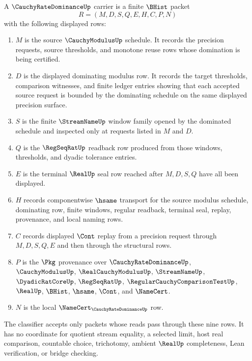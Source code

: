 \begin{definition}
\label{def:cauchy-rate-dominance-carrier}
A $\CauchyRateDominanceUp$ carrier is a finite $\BHist$ packet
$$
R=(M,D,S,Q,E,H,C,P,N)
$$
with the following displayed rows:
\begin{enumerate}
\item $M$ is the source $\CauchyModulusUp$ schedule. It records the precision requests, source thresholds, and monotone reuse rows whose domination is being certified.
\item $D$ is the displayed dominating modulus row. It records the target thresholds, comparison witnesses, and finite ledger entries showing that each accepted source request is bounded by the dominating schedule on the same displayed precision surface.
\item $S$ is the finite $\StreamNameUp$ window family opened by the dominated schedule and inspected only at requests listed in $M$ and $D$.
\item $Q$ is the $\RegSeqRatUp$ readback row produced from those windows, thresholds, and dyadic tolerance entries.
\item $E$ is the terminal $\RealUp$ seal row reached after $M,D,S,Q$ have all been displayed.
\item $H$ records componentwise $\hsame$ transport for the source modulus schedule, dominating row, finite windows, regular readback, terminal seal, replay, provenance, and local naming rows.
\item $C$ records displayed $\Cont$ replay from a precision request through $M,D,S,Q,E$ and then through the structural rows.
\item $P$ is the $\Pkg$ provenance over $\CauchyRateDominanceUp$, $\CauchyModulusUp$, $\RealCauchyModulusUp$, $\StreamNameUp$, $\DyadicRatCoreUp$, $\RegSeqRatUp$, $\RegularCauchyComparisonTestUp$, $\RealUp$, $\BHist$, $\hsame$, $\Cont$, and $\NameCert$.
\item $N$ is the local $\NameCert_{\CauchyRateDominanceUp}$ row.
\end{enumerate}
The classifier accepts only packets whose reads pass through these nine rows. It has no coordinate for quotient stream equality, a selected limit, host real comparison, countable choice, trichotomy, ambient $\RealUp$ completeness, Lean verification, or bridge checking.
\end{definition}

